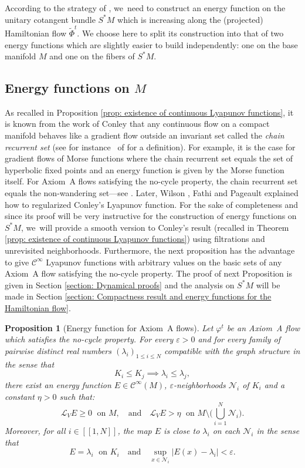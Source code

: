\documentclass[11pt]{article}
\newcommand{\lcr}{[\![}
\newcommand{\rcr}{]\!]}
\theoremstyle{definition}
\theoremstyle{plain}
\newtheorem{prop}[definition]{Proposition}
\newcommand{\Ccal}{\mathcal{C}}
\newcommand{\Lie}{\mathcal{L}}
\newcommand{\Ncal}{\mathcal{N}}
\begin{document}
According to the strategy of \cite{FS}, we~need to construct an energy function on the unitary cotangent bundle $S^*M$ which is increasing along the (projected) Hamiltonian flow $\widetilde{\Phi}^t$. We choose here to split its construction into that of two energy functions which are slightly easier to build independently: one on the base manifold $M$ and one on the fibers of $S^* M$.

\subsection{Energy functions on $M$}

As recalled in Proposition \ref{prop: existence of continuous Lyapunov functions}, it is known from the work of Conley \cite{conley} that any continuous flow on a compact manifold behaves like a gradient flow outside an invariant set called the \textit{chain recurrent set} (see for instance~\cite{palis-demelo} of \cite{FH} for a definition). For example, it is the case for gradient flows of Morse functions where the chain recurrent set equals the set of hyperbolic fixed points and an energy function is given by the Morse function itself. For Axiom~A flows satisfying the no-cycle property, the chain recurrent set equals the non-wandering set---see \cite[Th.\,5.3.47]{FH}. Later, Wilson \cite{wilson}, Fathi and Pageault \cite{fathi-pageault} explained how to regularized Conley's Lyapunov function. For the sake of completeness and since its proof will be very instructive for the construction of energy functions on $S^* M$, we~will provide a smooth version to Conley's result (recalled in Theorem \ref{prop: existence of continuous Lyapunov functions}) using filtrations and unrevisited neighborhoods. Furthermore, the next proposition has the advantage to give $\Ccal^{\infty}$ Lyapunov functions with arbitrary values on the basic sets of any Axiom~A flow satisfying the no-cycle property. The proof of next Proposition is given in Section \ref{section: Dynamical proofs} and the analysis on $S^*M$ will be made in Section \ref{section: Compactness result and energy functions for the Hamiltonian flow}.

\begin{prop}[Energy function for Axiom~A flows]\label{prop energy function for Axiom A flows}
Let $\varphi^t$ be an Axiom~A flow which satisfies the no-cycle property. For every $\varepsilon > 0$ and for every family of pairwise distinct real numbers $(\lambda_i)_{1\leq i \leq N}$ compatible with the graph structure in the sense that
\[
K_i \leq K_j \implies \lambda_i \leq \lambda_j,
\]
there exist an energy function $E \in \Ccal^{\infty}(M)$, $\varepsilon$-neighborhoods $ \Ncal_i$ of $K_i$ and a constant $\eta > 0$ such that:
\[
\Lie_V E \geq 0\;\text{ on } M, \quad \text{and}\quad \Lie_V E > \eta \;\text{ on } M \setminus \biggl(\bigcup_{i = 1}^N \Ncal_i \biggr).
\]
Moreover, for all $i\in\lcr1,N\rcr$, the map $E$ is close to $\lambda_i$ on each $\Ncal_i$ in the sense that
\[
E = \lambda_i \;\text{ on } K_i \quad\text{and}\quad \sup_{x \in \Ncal_i} |E(x) - \lambda_i | < \varepsilon.
\]
\end{prop}
\end{document}

